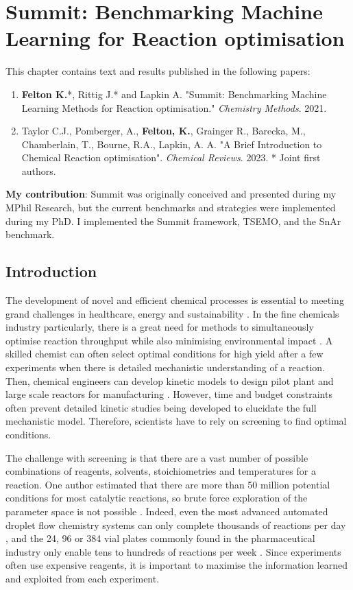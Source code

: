 \chapter{Summit: Benchmarking Machine Learning for Reaction optimisation}\label{ch:summit}

This chapter contains text and results published in the following papers:

\begin{enumerate}
\item \textbf{Felton K.}*, Rittig J.* and Lapkin A.  "Summit: Benchmarking Machine Learning Methods for Reaction optimisation." \textit{Chemistry Methods}. 2021.
\item Taylor C.J., Pomberger, A., \textbf{Felton, K.}, Grainger R., Barecka, M., Chamberlain, T., Bourne, R.A., Lapkin, A. A. "A Brief Introduction to Chemical Reaction optimisation". \textit{Chemical Reviews}. 2023.
* Joint first authors.
\end{enumerate}
\textbf{My contribution}: Summit was originally conceived and presented during my MPhil Research, but the current benchmarks and strategies were implemented during my PhD. I implemented the Summit framework, TSEMO, and the SnAr benchmark.


\section{Introduction}
The development of novel and efficient chemical processes is essential to meeting grand challenges in healthcare, energy and sustainability \cite{Sheldon2018,Rogers2019}. In the fine chemicals industry particularly, there is a great need for methods to simultaneously optimise reaction throughput while also minimising environmental impact \cite{Schweidtmann2018}. A skilled chemist can often select optimal conditions for high yield after a few experiments when there is detailed mechanistic understanding of a reaction. Then, chemical engineers can develop kinetic models to design pilot plant and large scale reactors for manufacturing \cite{Roberts2008}. However, time and budget constraints often prevent detailed kinetic studies being developed to elucidate the full mechanistic model. Therefore, scientists have to rely on screening to find optimal conditions. 

The challenge with screening is that there are a vast number of possible combinations of reagents, solvents, stoichiometries and temperatures for a reaction. One author estimated that there are more than 50 million potential conditions for most catalytic reactions, so brute force exploration of the parameter space is not possible \cite{Murray2013}. Indeed, even the most advanced automated droplet flow chemistry systems can only complete thousands of reactions per day \cite{Perera2018}, and the 24, 96 or 384 vial plates commonly found in the pharmaceutical industry only enable tens to hundreds of reactions per week \cite{BuitragoSantanilla2015, Shevlin2017, Mennen2019}. Since experiments often use expensive reagents, it is important to maximise the information learned and exploited from each experiment.

